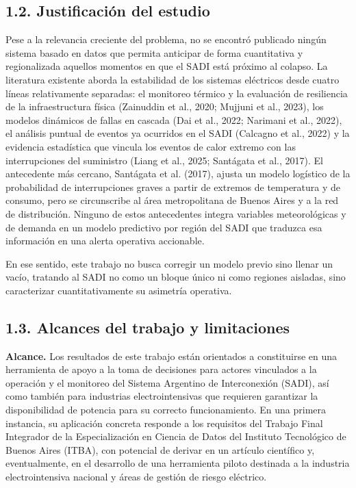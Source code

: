 \hypertarget{justificaciuxf3n-del-estudio}{%
\subsection{1.2. Justificación del estudio}\label{justificaciuxf3n-del-estudio}}

Pese a la relevancia creciente del problema, no se encontró publicado ningún sistema basado en datos que permita anticipar de forma cuantitativa y regionalizada aquellos momentos en que el SADI está próximo al colapso. La literatura existente aborda la estabilidad de los sistemas eléctricos desde cuatro líneas relativamente separadas: el monitoreo térmico y la evaluación de resiliencia de la infraestructura física (Zainuddin et al., 2020; Mujjuni et al., 2023), los modelos dinámicos de fallas en cascada (Dai et al., 2022; Narimani et al., 2022), el análisis puntual de eventos ya ocurridos en el SADI (Calcagno et al., 2022) y la evidencia estadística que vincula los eventos de calor extremo con las interrupciones del suministro (Liang et al., 2025; Santágata et al., 2017). El antecedente más cercano, Santágata et al. (2017), ajusta un modelo logístico de la probabilidad de interrupciones graves a partir de extremos de temperatura y de consumo, pero se circunscribe al área metropolitana de Buenos Aires y a la red de distribución. Ninguno de estos antecedentes integra variables meteorológicas y de demanda en un modelo predictivo por región del SADI que traduzca esa información en una alerta operativa accionable.

En ese sentido, este trabajo no busca corregir un modelo previo sino llenar un vacío, tratando al SADI no como un bloque único ni como regiones aisladas, sino caracterizar cuantitativamente su asimetría operativa.

\hypertarget{alcances-del-trabajo-y-limitaciones}{%
\subsection{1.3. Alcances del trabajo y limitaciones}\label{alcances-del-trabajo-y-limitaciones}}

\textbf{Alcance.} Los resultados de este trabajo están orientados a constituirse en una herramienta de apoyo a la toma de decisiones para actores vinculados a la operación y el monitoreo del Sistema Argentino de Interconexión (SADI), así como también para industrias electrointensivas que requieren garantizar la disponibilidad de potencia para su correcto funcionamiento. En una primera instancia, su aplicación concreta responde a los requisitos del Trabajo Final Integrador de la Especialización en Ciencia de Datos del Instituto Tecnológico de Buenos Aires (ITBA), con potencial de derivar en un artículo científico y, eventualmente, en el desarrollo de una herramienta piloto destinada a la industria electrointensiva nacional y áreas de gestión de riesgo eléctrico.

